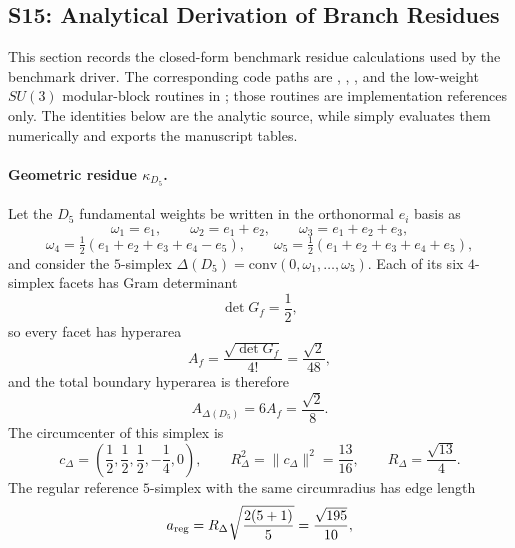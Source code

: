 \documentclass[11pt]{article}
\begin{document}
\subsection*{S15: Analytical Derivation of Branch Residues}

This section records the closed-form benchmark residue calculations used by the benchmark driver. The corresponding code paths are ,
,
, and the low-weight $SU(3)$ modular-block routines in ; those routines are implementation references only. The identities below are the analytic source, while  simply evaluates them numerically and exports the manuscript tables.

\paragraph{Geometric residue $\kappa_{D_5}$.}
Let the $D_5$ fundamental weights be written in the orthonormal $e_i$ basis as
\begin{equation}
 \omega_1=e_1,
 \qquad
 \omega_2=e_1+e_2,
 \qquad
 \omega_3=e_1+e_2+e_3,
\end{equation}
\begin{equation}
 \omega_4=\tfrac12(e_1+e_2+e_3+e_4-e_5),
 \qquad
 \omega_5=\tfrac12(e_1+e_2+e_3+e_4+e_5),
\end{equation}
and consider the $5$-simplex $\Delta(D_5)=\mathrm{conv}(0,\omega_1,\dots,\omega_5)$. Each of its six $4$-simplex facets has Gram determinant
\begin{equation}
 \det G_f = \frac12,
\end{equation}
so every facet has hyperarea
\begin{equation}
 A_f = \frac{\sqrt{\det G_f}}{4!} = \frac{\sqrt2}{48},
\end{equation}
and the total boundary hyperarea is therefore
\begin{equation}
 A_{\Delta(D_5)} = 6A_f = \frac{\sqrt2}{8}.
\end{equation}
The circumcenter of this simplex is
\begin{equation}
 c_\Delta=\left(\frac12,\frac12,\frac12,-\frac14,0\right),
 \qquad
 R_\Delta^2 = \|c_\Delta\|^2 = \frac{13}{16},
 \qquad
 R_\Delta = \frac{\sqrt{13}}{4}.
\end{equation}
The regular reference $5$-simplex with the same circumradius has edge length
\begin{equation}
 a_{\rm reg}=R_\Delta\sqrt{\frac{2(5+1)}{5}}=\frac{\sqrt{195}}{10},
\end{equation}
\end{document}
